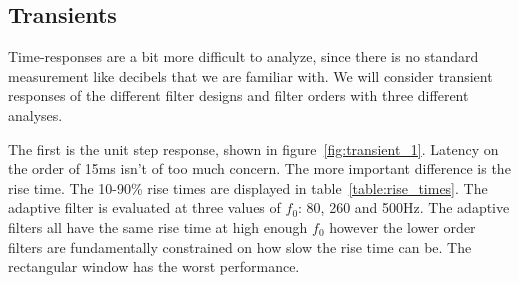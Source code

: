 \documentclass [11pt, proquest,oneside] {ganter_thesis}[2015/03/03]
\begin{document}









\clearpage

\subsection{Transients}

Time-responses are a bit more difficult to analyze, since there is no standard measurement like decibels that we are familiar with.  We will consider transient responses of the different filter designs and filter orders with three different analyses.

The first is the unit step response, shown in figure~\ref{fig:transient_1}.  Latency on the order of 15ms isn't of too much concern.  The more important difference is the rise time.  The 10-90\% rise times are displayed in table~\ref{table:rise_times}.  The adaptive filter is evaluated at three values of $f_0$: 80, 260 and 500Hz.  The adaptive filters all have the same rise time at high enough $f_0$ however the lower order filters are fundamentally constrained on how slow the rise time can be.  The rectangular window has the worst performance.
\end{document}
